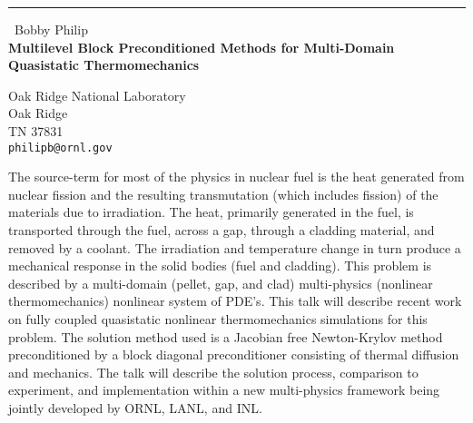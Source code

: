 \documentclass{report}
\begin{document}
\begin{center}
\rule{6in}{1pt} \
{\large Bobby Philip \\
{\bf Multilevel Block Preconditioned Methods for Multi-Domain Quasistatic Thermomechanics}}

Oak Ridge National Laboratory \\ Oak Ridge \\ TN 37831
\\
{\tt philipb@ornl.gov}\end{center}

The source-term for most of the physics in nuclear fuel is the heat
generated from nuclear fission and the resulting transmutation (which
includes fission) of the materials due to irradiation. The heat,
primarily generated in the fuel, is transported through the fuel, across
a gap, through a cladding material, and removed by a coolant. The
irradiation and temperature change in turn produce a mechanical response
in the solid bodies (fuel and cladding). This problem is described by a
multi-domain (pellet, gap, and clad) multi-physics (nonlinear
thermomechanics) nonlinear system of PDE's. This talk will describe
recent work on fully coupled quasistatic nonlinear thermomechanics
simulations for this problem. The solution method used is a Jacobian free
Newton-Krylov method preconditioned by a block diagonal preconditioner
consisting of thermal diffusion and mechanics. The talk will describe the
solution process, comparison to experiment, and implementation within a
new multi-physics framework being jointly developed by ORNL, LANL, and
INL.
\end{document}
